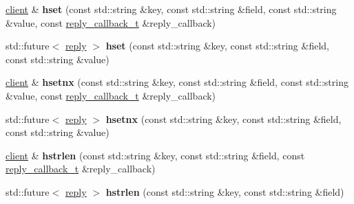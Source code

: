 \begin{DoxyCompactItemize}
\item 
\mbox{\label{classcpp__redis_1_1client_a3d5367719dc31fb3dfa49202d1e7f9ad}} 
\hyperlink{classcpp__redis_1_1client}{client} \& {\bfseries hset} (const std\+::string \&key, const std\+::string \&field, const std\+::string \&value, const \hyperlink{classcpp__redis_1_1client_a061a1140d36d2eaeda82b09a0bb3f9f2}{reply\+\_\+callback\+\_\+t} \&reply\+\_\+callback)
\item 
\mbox{\label{classcpp__redis_1_1client_ae212c8371dbd9ceff386f789226eb173}} 
std\+::future$<$ \hyperlink{classcpp__redis_1_1reply}{reply} $>$ {\bfseries hset} (const std\+::string \&key, const std\+::string \&field, const std\+::string \&value)
\item 
\mbox{\label{classcpp__redis_1_1client_a6cf21d60012fc82075deb801a32e8d60}} 
\hyperlink{classcpp__redis_1_1client}{client} \& {\bfseries hsetnx} (const std\+::string \&key, const std\+::string \&field, const std\+::string \&value, const \hyperlink{classcpp__redis_1_1client_a061a1140d36d2eaeda82b09a0bb3f9f2}{reply\+\_\+callback\+\_\+t} \&reply\+\_\+callback)
\item 
\mbox{\label{classcpp__redis_1_1client_a72b5a16cc761f51e9986bcfcf644e999}} 
std\+::future$<$ \hyperlink{classcpp__redis_1_1reply}{reply} $>$ {\bfseries hsetnx} (const std\+::string \&key, const std\+::string \&field, const std\+::string \&value)
\item 
\mbox{\label{classcpp__redis_1_1client_a5e1543cd782d3ff9d17de5e200fd038a}} 
\hyperlink{classcpp__redis_1_1client}{client} \& {\bfseries hstrlen} (const std\+::string \&key, const std\+::string \&field, const \hyperlink{classcpp__redis_1_1client_a061a1140d36d2eaeda82b09a0bb3f9f2}{reply\+\_\+callback\+\_\+t} \&reply\+\_\+callback)
\item 
\mbox{\label{classcpp__redis_1_1client_a612c5f64a9fec6c8c2df8b113173146a}} 
std\+::future$<$ \hyperlink{classcpp__redis_1_1reply}{reply} $>$ {\bfseries hstrlen} (const std\+::string \&key, const std\+::string \&field)
\item 
\mbox{\label{classcpp__redis_1_1client_af74a8adbcd6f21178b43f3f2edddb472}} 

\end{DoxyCompactItemize}

